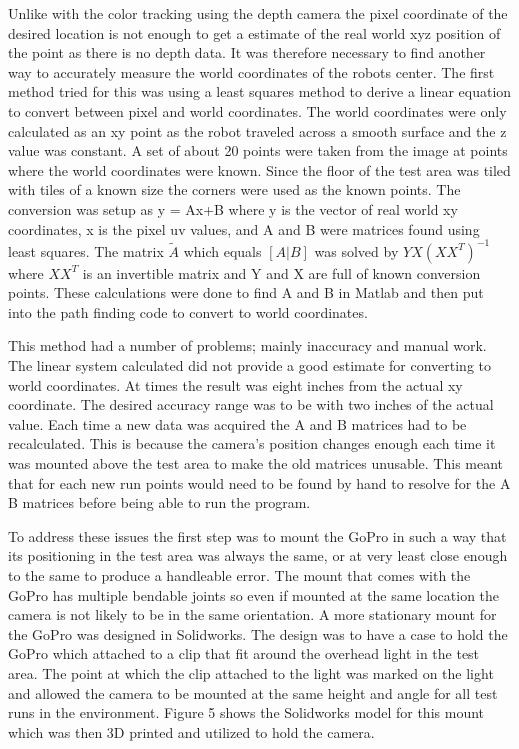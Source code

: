 \documentclass[letterpaper,12pt]{report}
\begin{document}
Unlike with the color tracking using the depth camera the pixel coordinate of the desired location is not enough to get a estimate of the real world xyz position of the point as there is no depth data. It was therefore necessary to find another way to accurately measure the world coordinates of the robots center. The first method tried for this was using a least squares method to derive a linear equation to convert between pixel and world coordinates. The world coordinates were only calculated as an xy point as the robot traveled across a smooth surface and the z value was constant. A set of about 20 points were taken from the image at points where the world coordinates were known. Since the floor of the test area was tiled with tiles of a known size the corners were used as the known points. The conversion was setup as y = Ax+B where y is the vector of real world xy coordinates, x is the pixel uv values, and A and B were matrices found using least squares. The matrix $\tilde{A}$ which equals $[A|B]$ was solved by $YX(XX^T)^{-1}$ where $XX^T$ is an invertible matrix and Y and X are full of known conversion points. These calculations were done to find A and B in Matlab and then put into the path finding code to convert to world coordinates.

This method had a number of problems; mainly inaccuracy and manual work. The linear system calculated did not provide a good estimate for converting to world coordinates. At times the result was eight inches from the actual xy coordinate. The desired accuracy range was to be with two inches of the actual value. Each time a new data was acquired the A and B matrices had to be recalculated. This is because the camera's position changes enough each time it was mounted above the test area to make the old matrices unusable. This meant that for each new run points would need to be found by hand to resolve for the A B matrices before being able to run the program.

To address these issues the first step was to mount the GoPro in such a way that its positioning in the test area was always the same, or at very least close enough to the same to produce a handleable error. The mount that comes with the GoPro has multiple bendable joints so even if mounted at the same location the camera is not likely to be in the same orientation. A more stationary mount for the GoPro was designed in Solidworks. The design was to have a case to hold the GoPro which attached to a clip that fit around the overhead light in the test area. The point at which the clip attached to the light was marked on the light and allowed the camera to be mounted at the same height and angle for all test runs in the environment. Figure 5 shows the Solidworks model for this mount which was then 3D printed and utilized to hold the camera.
\end{document}
